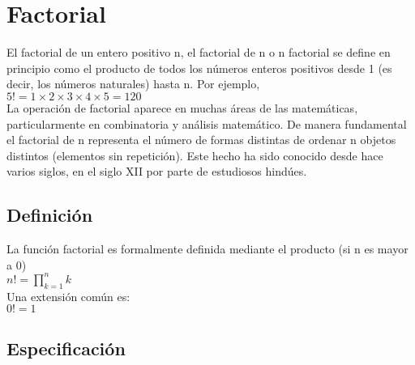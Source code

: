 \documentclass{article}
\begin{document}
    
    \maketitle
    
    \tableofcontents
    \newpage
    
    \section{Factorial}
        
                El factorial de un entero positivo n, el factorial de n o n factorial se define en principio como el producto de todos los números enteros positivos desde 1 (es decir, los números naturales) hasta n. Por ejemplo,\\
        
                $5! = 1 \times 2 \times 3 \times 4 \times 5 = 120$\\
        
                La operación de factorial aparece en muchas áreas de las matemáticas, particularmente en combinatoria y análisis matemático. De manera fundamental el factorial de n representa el número de formas distintas de ordenar n objetos distintos (elementos sin repetición). Este hecho ha sido conocido desde hace varios siglos, en el siglo XII por parte de estudiosos hindúes.
                
                \subsection{Definición}
        
                    La función factorial es formalmente definida mediante el producto (si n es mayor a 0)\\
                    $n! = \prod_{k=1}^{n} k$\\
                    Una extensión común es:\\
                    $0! = 1$
        
                \subsection{Especificación}
        
\end{document}
